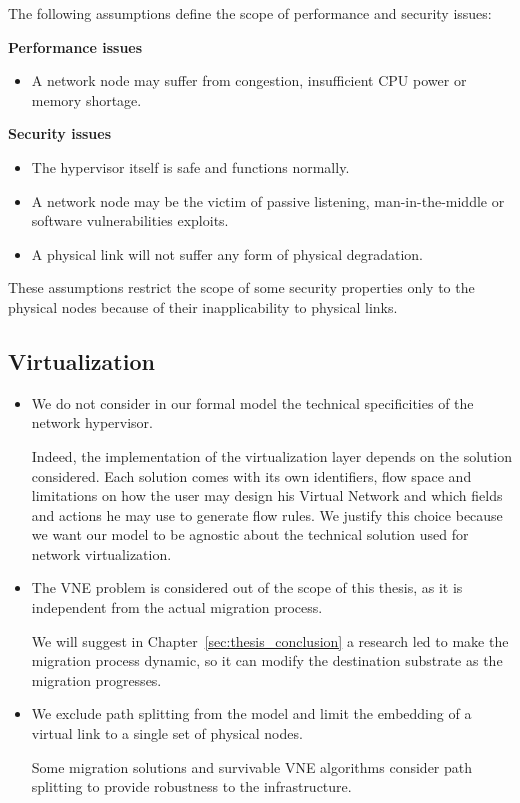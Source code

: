 \newpage
The following assumptions define the scope of performance and security issues:

\textbf{Performance issues} 
\begin{itemize}
    \item A network node may suffer from congestion, insufficient CPU power or memory shortage. 
\end{itemize} 

\textbf{Security issues} 
\begin{itemize}
    \item The hypervisor itself is safe and functions normally.
    \item A network node may be the victim of passive listening, man-in-the-middle or software vulnerabilities exploits.
    \item A physical link will not suffer any form of physical degradation.
\end{itemize}

These assumptions restrict the scope of some security properties only to the physical nodes because of their inapplicability to physical links.



\subsection{Virtualization}

\begin{itemize}
    \item We do not consider in our formal model the technical specificities of the network hypervisor.
    
    Indeed, the implementation of the virtualization layer depends on the solution considered.
    Each solution comes with its own identifiers, flow space and limitations on how the user may design his Virtual Network and which fields and actions he may use to generate flow rules. 
    We justify this choice because we want our model to be agnostic about the technical solution used for network virtualization.
    
    \item The VNE problem is considered out of the scope of this thesis, as it is independent from the actual migration process. 
    
    We will suggest in Chapter~\ref{sec:thesis_conclusion} a research led to make the migration process dynamic, so it can modify the destination substrate as the migration progresses. 
    
    \item We exclude path splitting from the model and limit the embedding of a virtual link to a single set of physical nodes.
    
    Some migration solutions and survivable VNE algorithms consider path splitting to provide robustness to the infrastructure.


    
\end{itemize}





